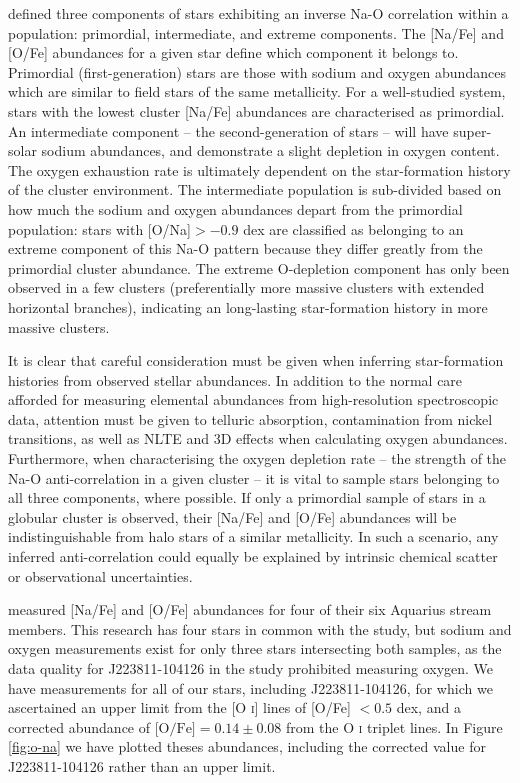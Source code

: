 \documentclass{emulateapj}
\begin{document}
\citet{carretta;et-al_2009_na_o} defined three components of stars exhibiting an inverse Na-O correlation within a population: primordial, intermediate, and extreme components. The [Na/Fe] and [O/Fe] abundances for a given star define which component it belongs to. Primordial (first-generation) stars are those with sodium and oxygen abundances which are similar to field stars of the same metallicity. For a well-studied system, stars with the lowest cluster [Na/Fe] abundances are characterised as primordial. An intermediate component \--- the second-generation of stars \--- will have super-solar sodium abundances, and demonstrate a slight depletion in oxygen content. The oxygen exhaustion rate is ultimately dependent on the star-formation history of the cluster environment. The intermediate population is sub-divided based on how much the sodium and oxygen abundances depart from the primordial population: stars with [O/Na]$ > -0.9$ dex are classified as belonging to an extreme component of this Na-O pattern because they differ greatly from the primordial cluster abundance. The extreme O-depletion component has only been observed in a few clusters (preferentially more massive clusters with extended horizontal branches), indicating an long-lasting star-formation history in more massive clusters.

It is clear that careful consideration must be given when inferring star-formation histories from observed stellar abundances. In addition to the normal care afforded for measuring elemental abundances from high-resolution spectroscopic data, attention must be given to telluric absorption, contamination from nickel transitions, as well as NLTE and 3D effects when calculating oxygen abundances. Furthermore, when characterising the oxygen depletion rate \--- the strength of the Na-O anti-correlation in a given cluster \--- it is vital to sample stars belonging to all three components, where possible. If only a primordial sample of stars in a globular cluster is observed, their [Na/Fe] and [O/Fe] abundances will be indistinguishable from halo stars of a similar metallicity. In such a scenario, any inferred anti-correlation could equally be explained by intrinsic chemical scatter or observational uncertainties.

\citet{wylie-de-boer;et-al_2012} measured [Na/Fe] and [O/Fe] abundances for four of their six Aquarius stream members. This research has four stars in common with the \citet{wylie-de-boer;et-al_2012} study, but sodium and oxygen measurements exist for only three stars intersecting both samples, as the data quality for J223811-104126 in the \citet{wylie-de-boer;et-al_2012} study prohibited measuring oxygen. We have measurements for all of our stars, including J223811-104126, for which we ascertained an upper limit from the [O \textsc{i}] lines of [O/Fe] $< 0.5$ dex, and a corrected abundance of $\mbox{[O/Fe]} = 0.14 \pm 0.08$ from the O \textsc{i} triplet lines. In Figure \ref{fig:o-na} we have plotted theses abundances, including the corrected value for J223811-104126 rather than an upper limit.
\end{document}
